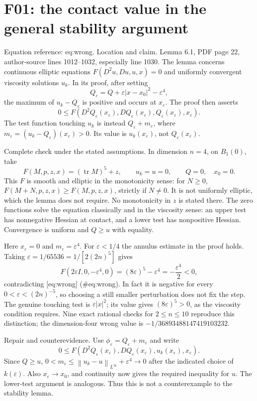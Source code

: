 \documentclass[10pt]{article}
\begin{document}
\section*{F01: the contact value in the general stability argument}
Equation reference: eq:wrong. Location and claim. Lemma 6.1, PDF page 22, author-source lines 1012–1032, especially line 1030. The lemma concerns continuous elliptic equations \(F(D^2u,Du,u,x)=0\) and uniformly convergent viscosity solutions \(u_k\). In its proof, after setting \[Q_\varepsilon=Q+\varepsilon|x-x_0|^2-\varepsilon^4,\] the maximum of \(u_k-Q_\varepsilon\) is positive and occurs at \(x_\varepsilon\). The proof then asserts \[
 0\le F(D^2Q_\varepsilon(x_\varepsilon),DQ_\varepsilon(x_\varepsilon),
                 Q_\varepsilon(x_\varepsilon),x_\varepsilon).\] The test function touching \(u_k\) is instead \(Q_\varepsilon+m_\varepsilon\), where \(m_\varepsilon=(u_k-Q_\varepsilon)(x_\varepsilon)>0\). Its value is \(u_k(x_\varepsilon)\), not \(Q_\varepsilon(x_\varepsilon)\).\par
Complete check under the stated assumptions. In dimension \(n=4\), on \(B_1(0)\), take \[F(M,p,z,x)=(\operatorname{tr}M)^5+z,\qquad u_k=u=0,\qquad Q=0,\quad x_0=0.\] This \(F\) is smooth and elliptic in the monotonicity sense: for \(N\ge0\), \(F(M+N,p,z,x)\ge F(M,p,z,x)\), strictly if \(N\ne0\). It is not uniformly elliptic, which the lemma does not require. No monotonicity in \(z\) is stated there. The zero functions solve the equation classically and in the viscosity sense: an upper test has nonnegative Hessian at contact, and a lower test has nonpositive Hessian. Convergence is uniform and \(Q\ge u\) with equality.\par
Here \(x_\varepsilon=0\) and \(m_\varepsilon=\varepsilon^4\). For \(\varepsilon<1/4\) the annulus estimate in the proof holds. Taking \(\varepsilon=1/65536=1/[2(2n)^5]\) gives \[F(2\varepsilon I,0,-\varepsilon^4,0)
       =(8\varepsilon)^5-\varepsilon^4
       =-\frac{\varepsilon^4}{2}<0,\] contradicting [eq:wrong] (\#eq:wrong). In fact it is negative for every \(0<\varepsilon<(2n)^{-5}\), so choosing a still smaller perturbation does not fix the step. The genuine touching test is \(\varepsilon|x|^2\); its value gives \((8\varepsilon)^5>0\), as the viscosity condition requires. Nine exact rational checks for \(2\le n\le10\) reproduce this distinction; the dimension-four wrong value is \(-1/36893488147419103232\).\par
Repair and counterevidence. Use \(\phi_\varepsilon=Q_\varepsilon+m_\varepsilon\) and write \[0\le F(D^2Q_\varepsilon(x_\varepsilon),DQ_\varepsilon(x_\varepsilon),
                    u_k(x_\varepsilon),x_\varepsilon).\] Since \(Q\ge u\), \(0<m_\varepsilon\le\left\lVert u_k-u\right\rVert_{L^\infty}+\varepsilon^4\to0\) after the indicated choice of \(k(\varepsilon)\). Also \(x_\varepsilon\to x_0\), and continuity now gives the required inequality for \(u\). The lower-test argument is analogous. Thus this is not a counterexample to the stability lemma.\par
\end{document}
